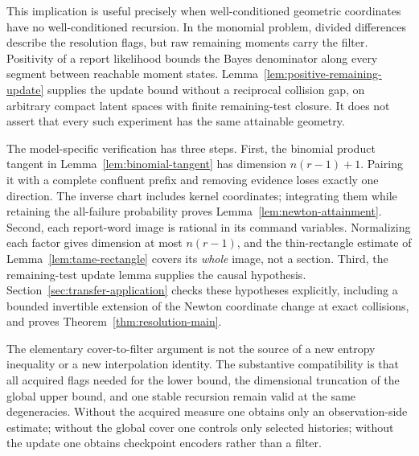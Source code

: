 This implication is useful precisely when well-conditioned geometric
coordinates have no well-conditioned recursion. In the monomial
problem, divided differences describe the resolution flags, but raw
remaining moments carry the filter. Positivity of a report likelihood
bounds the Bayes denominator along every segment between reachable
moment states. Lemma~\ref{lem:positive-remaining-update} supplies the
update bound without a reciprocal collision gap, on arbitrary compact
latent spaces with finite remaining-test closure. It does not assert
that every such experiment has the same attainable geometry.

The model-specific verification has three steps. First, the binomial
product tangent in Lemma~\ref{lem:binomial-tangent} has dimension
$n(r-1)+1$. Pairing it with a complete confluent prefix and removing
evidence loses exactly one direction. The inverse chart includes
kernel coordinates; integrating them while retaining the all-failure
probability proves Lemma~\ref{lem:newton-attainment}. Second, each
report-word image is rational in its command variables. Normalizing
each factor gives dimension at most $n(r-1)$, and the
thin-rectangle estimate of Lemma~\ref{lem:tame-rectangle} covers its
\emph{whole} image, not a section. Third, the remaining-test update
lemma supplies the causal hypothesis. Section~\ref{sec:transfer-application}
checks these hypotheses explicitly, including a bounded invertible
extension of the Newton coordinate change at exact collisions, and
proves Theorem~\ref{thm:resolution-main}.

The elementary cover-to-filter argument is not the source of a new
entropy inequality or a new interpolation identity. The substantive
compatibility is that all acquired flags needed for the lower bound,
the dimensional truncation of the global upper bound, and one stable
recursion remain valid at the same degeneracies. Without the acquired
measure one obtains only an observation-side estimate; without the
global cover one controls only selected histories; without the update
one obtains checkpoint encoders rather than a filter.

